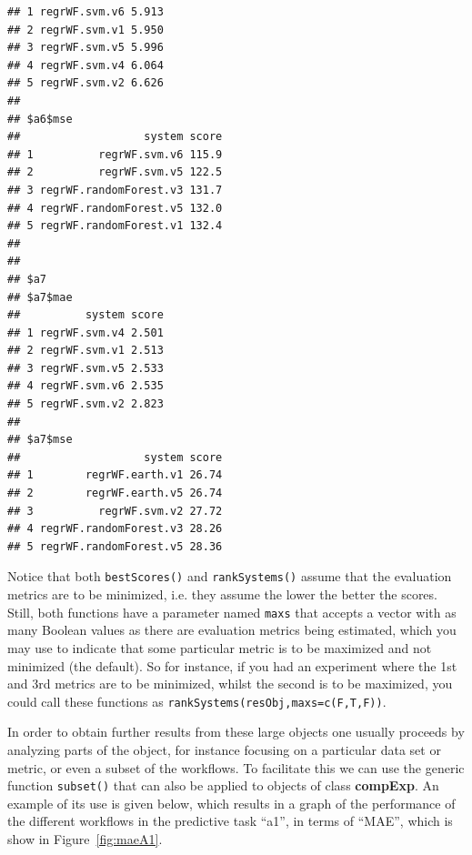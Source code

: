 \documentclass[10pt,a4paper]{article}\usepackage[]{graphicx}\usepackage[]{color}
\makeatletter
\newenvironment{kframe}{%
 \def\at@end@of@kframe{}%
 \ifinner\ifhmode%
  \def\at@end@of@kframe{\end{minipage}}%
  \begin{minipage}{\columnwidth}%
 \fi\fi%
 \def\FrameCommand##1{\hskip\@totalleftmargin \hskip-\fboxsep
 \colorbox{shadecolor}{##1}\hskip-\fboxsep
     \hskip-\linewidth \hskip-\@totalleftmargin \hskip\columnwidth}%
 \MakeFramed {\advance\hsize-\width
   \@totalleftmargin\z@ \linewidth\hsize
   \@setminipage}}%
 {\par\unskip\endMakeFramed%
 \at@end@of@kframe}
\newenvironment{knitrout}{}{} %
\makeatother
\begin{document}
\begin{knitrout}
\begin{kframe}
\begin{verbatim}
## 1 regrWF.svm.v6 5.913
## 2 regrWF.svm.v1 5.950
## 3 regrWF.svm.v5 5.996
## 4 regrWF.svm.v4 6.064
## 5 regrWF.svm.v2 6.626
## 
## $a6$mse
##                   system score
## 1          regrWF.svm.v6 115.9
## 2          regrWF.svm.v5 122.5
## 3 regrWF.randomForest.v3 131.7
## 4 regrWF.randomForest.v5 132.0
## 5 regrWF.randomForest.v1 132.4
## 
## 
## $a7
## $a7$mae
##          system score
## 1 regrWF.svm.v4 2.501
## 2 regrWF.svm.v1 2.513
## 3 regrWF.svm.v5 2.533
## 4 regrWF.svm.v6 2.535
## 5 regrWF.svm.v2 2.823
## 
## $a7$mse
##                   system score
## 1        regrWF.earth.v1 26.74
## 2        regrWF.earth.v5 26.74
## 3          regrWF.svm.v2 27.72
## 4 regrWF.randomForest.v3 28.26
## 5 regrWF.randomForest.v5 28.36
\end{verbatim}
\end{kframe}
\end{knitrout}


Notice that both \texttt{bestScores()} and \texttt{rankSystems()}
assume that the evaluation metrics are to be minimized, i.e. they
assume the lower the better the scores. Still, both functions have a
parameter named \texttt{maxs} that accepts a vector with as many
Boolean values as there are evaluation metrics being estimated, which
you may use to indicate that some particular metric is to be maximized
and not minimized (the default). So for instance, if you had an
experiment where the 1st and 3rd metrics are to be minimized, whilst
the second is to be maximized, you could call these functions as
\texttt{rankSystems(resObj,maxs=c(F,T,F))}.

In order to obtain further results from these large objects one
usually proceeds by analyzing parts of the object, for instance
focusing on a particular data set or metric, or even a subset of the
workflows. To facilitate this we can use the generic function
\texttt{subset()} that can also be applied to objects of class
\textbf{compExp}. An example of its use is given below, which results
in a graph of the performance of the different workflows in the
predictive task ``a1'', in terms of ``MAE'', which is show in
Figure~\ref{fig:maeA1}.
\end{document}
